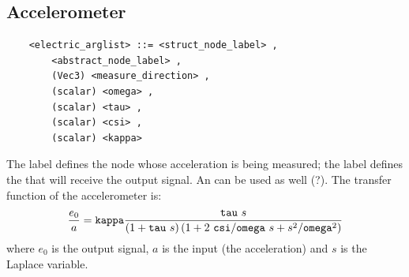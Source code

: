 \subsection{Accelerometer}
  \begin{verbatim}
    <electric_arglist> ::= <struct_node_label> ,
        <abstract_node_label> ,
        (Vec3) <measure_direction> ,
        (scalar) <omega> ,
        (scalar) <tau> ,
        (scalar) <csi> ,
        (scalar) <kappa>	
  \end{verbatim}
  The label  defines the node whose acceleration 
  is being measured; the label  defines the
   that will receive the output signal. 
  An  can be used as well (?).
  The transfer function of the accelerometer is:
  \begin{displaymath}
    \frac{e_0}{a} = \texttt{kappa}\frac{\texttt{tau} \ s}{
      \left( 1+\texttt{tau} \ s \right)
      \left( 1+2 \ \texttt{csi}/\texttt{omega} \ s+s^2/\texttt{omega}^2 \right)
    }
  \end{displaymath}
  where $ e_0 $ is the output signal, $ a $ is the input (the acceleration)
  and $ s $ is the Laplace variable.

